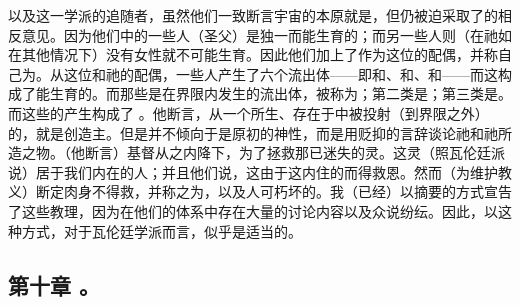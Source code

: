 以及这一学派的追随者，虽然他们一致断言宇宙的本原就是，但仍被迫采取了的相反意见。因为他们中的一些人（圣父）是独一而能生育的；而另一些人则（在祂如在其他情况下）没有女性就不可能生育。因此他们加上了作为这位的配偶，并称自己为。从这位和祂的配偶，一些人产生了六个流出体——即和、和、和——而这构成了能生育的。而那些是在界限内发生的流出体，被称为；第二类是；第三类是。而这些的产生构成了 。他断言，从一个所生、存在于中被投射（到界限之外）的，就是创造主。但是并不倾向于是原初的神性，而是用贬抑的言辞谈论祂和祂所造之物。（他断言）基督从之内降下，为了拯救那已迷失的灵。这灵（照瓦伦廷派说）居于我们内在的人；并且他们说，这由于这内住的而得救恩。然而（为维护教义）断定肉身不得救，并称之为，以及人可朽坏的。我（已经）以摘要的方式宣告了这些教理，因为在他们的体系中存在大量的讨论内容以及众说纷纭。因此，以这种方式，对于瓦伦廷学派而言，似乎是适当的。\par


\subsection{第十章 。}

